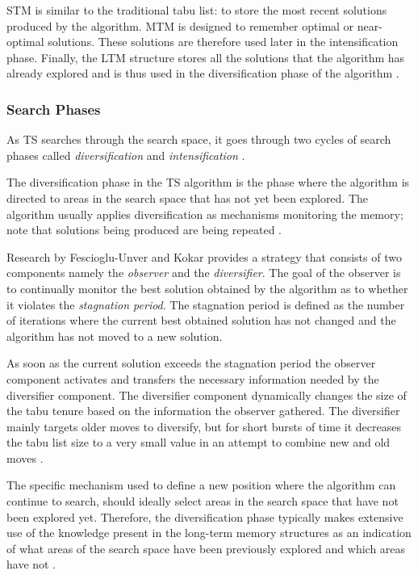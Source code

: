 STM is similar to the traditional tabu list: to store the most recent solutions produced by the algorithm. \gls{MTM} is designed to remember optimal or near-optimal solutions. These solutions are therefore used later in the intensification phase. Finally, the \gls{LTM} structure stores all the solutions that the algorithm has already explored and is thus used in the diversification phase of the algorithm \cite{MultiObjTabu}.

\subsubsection{Search Phases}
\label{TSSearchPhases}
As \gls{TS} searches through the search space, it goes through two cycles of search phases called \emph{diversification} and \emph{intensification} \cite{TabuParameterization,TabuCrewSchedulingProblem,NonlinearGlobalTabu,SelfControllingReactiveTabu}.

The diversification phase in the \gls{TS} algorithm is the phase where the algorithm is directed to areas in the search space that has not yet been explored. The algorithm usually applies diversification as mechanisms monitoring the memory; note that solutions being produced are being repeated \cite{ReactiveTabuVHR,SelfControllingReactiveTabu}. 

Research by Fescioglu-Unver and Kokar \cite{SelfControllingReactiveTabu} provides a strategy that consists of two components namely the \emph{observer} and the \emph{diversifier}. The goal of the observer is to continually monitor the best solution obtained by the algorithm as to whether it violates the \emph{stagnation period}. The stagnation period is defined as the number of iterations where the current best obtained solution has not changed and the algorithm has not moved to a new solution\cite{SelfControllingReactiveTabu}. 

As soon as the current solution exceeds the stagnation period the observer component activates and transfers the necessary information needed by the diversifier component. The diversifier component dynamically changes the size of the tabu tenure based on the information the observer gathered. The diversifier mainly targets older moves to diversify, but for short bursts of time it decreases the tabu list size to a very small value in an attempt to combine new and old moves \cite{SelfControllingReactiveTabu}.

The specific mechanism used to define a new position where the algorithm can continue to search, should ideally select areas in the search space that have not been explored yet. Therefore, the diversification phase typically makes extensive use of the knowledge present in the long-term memory structures as an indication of what areas of the search space have been previously explored and which areas have not \cite{TabuParameterization,TabuCrewSchedulingProblem,NonlinearGlobalTabu,SelfControllingReactiveTabu}.

